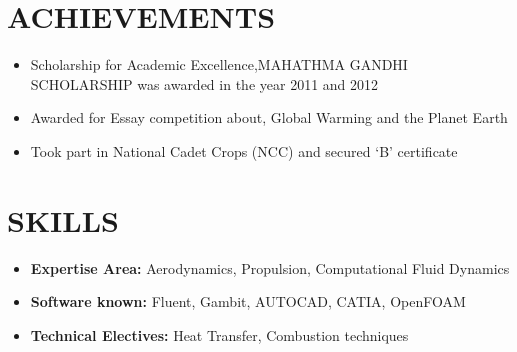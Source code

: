\documentclass{res}
\begin{document}
\begin{resume}
	
	
	
	
	
	
	
	\section{\MakeUppercase{Achievements}} \vskip 0.35in
	\begin{itemize}[leftmargin=\parindent]
	\setlength{\itemsep}{6pt}
	
		\item[] Scholarship for Academic Excellence,MAHATHMA GANDHI SCHOLARSHIP was awarded in the year 2011 and 2012
		\item[] Awarded for Essay competition about, Global Warming and the Planet Earth
		\item[] Took part in National Cadet Crops (NCC) and secured ‘B’ certificate
	\end{itemize}
	
		
	
	
	
	\section{\MakeUppercase{Skills}} \vskip 0.35in
	\begin{itemize}[leftmargin=\parindent]
	\setlength{\itemsep}{6pt}
	
		\item[] {\bf Expertise Area:} Aerodynamics, Propulsion, Computational Fluid Dynamics
		\item[] {\bf Software known:} Fluent, Gambit, AUTOCAD, CATIA, OpenFOAM
		\item[] {\bf Technical Electives:} Heat Transfer, Combustion techniques
	\end{itemize}
	
		
	
	
	\end{resume}
	
\end{document}

